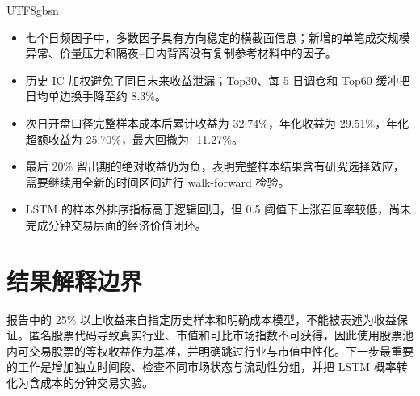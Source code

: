 \documentclass[a4paper,11pt,openany]{report}
\begin{document}
\begin{CJK*}{UTF8}{gbsn}
\begin{itemize}
  \item 七个日频因子中，多数因子具有方向稳定的横截面信息；新增的单笔成交规模异常、价量压力和隔夜--日内背离没有复制参考材料中的因子。
  \item 历史 IC 加权避免了同日未来收益泄漏；Top30、每 5 日调仓和 Top60 缓冲把日均单边换手降至约 8.3\%。
  \item 次日开盘口径完整样本成本后累计收益为 32.74\%，年化收益为 29.51\%，年化超额收益为 25.70\%，最大回撤为 -11.27\%。
  \item 最后 20\% 留出期的绝对收益仍为负，表明完整样本结果含有研究选择效应，需要继续用全新的时间区间进行 walk-forward 检验。
  \item LSTM 的样本外排序指标高于逻辑回归，但 0.5 阈值下上涨召回率较低，尚未完成分钟交易层面的经济价值闭环。
\end{itemize}

\section{结果解释边界}

报告中的 25\% 以上收益来自指定历史样本和明确成本模型，不能被表述为收益保证。匿名股票代码导致真实行业、市值和可比市场指数不可获得，因此使用股票池内可交易股票的等权收益作为基准，并明确跳过行业与市值中性化。下一步最重要的工作是增加独立时间段、检查不同市场状态与流动性分组，并把 LSTM 概率转化为含成本的分钟交易实验。

\end{CJK*}
\end{document}
